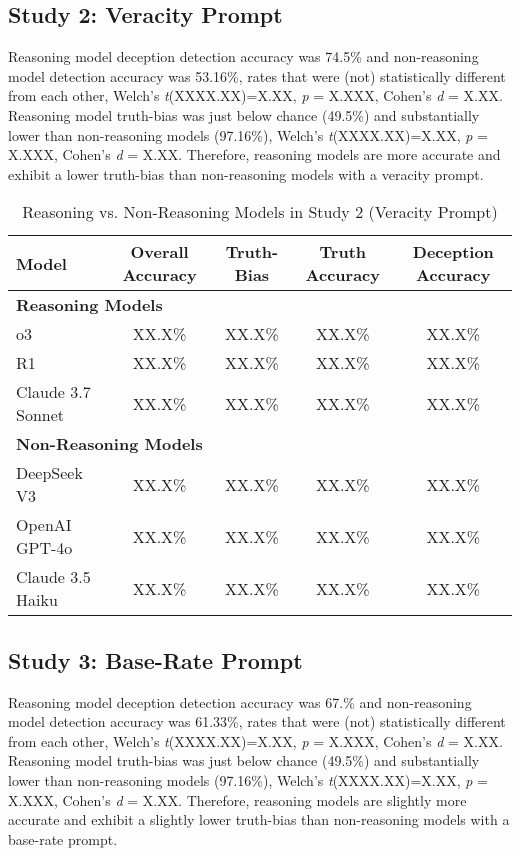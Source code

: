\documentclass{article}
\begin{document}
\subsection{Study 2: Veracity Prompt}

Reasoning model deception detection accuracy was 74.5\% and non-reasoning model detection accuracy was 53.16\%, rates that were (not) statistically different from each other, Welch's \textit{t}(XXXX.XX)=X.XX, \textit{p} = X.XXX, Cohen's \textit{d} = X.XX. Reasoning model truth-bias was just below chance (49.5\%) and substantially lower than non-reasoning models (97.16\%), Welch's \textit{t}(XXXX.XX)=X.XX, \textit{p} = X.XXX, Cohen's \textit{d} = X.XX. Therefore, reasoning models are more accurate and exhibit a lower truth-bias than non-reasoning models with a veracity prompt.

\begin{table}[ht]
\centering
\caption{Reasoning vs. Non-Reasoning Models in Study 2 (Veracity Prompt)}
\begin{tabular}{lcccc}
\toprule
\textbf{Model} & \textbf{Overall Accuracy} & \textbf{Truth-Bias} & \textbf{Truth Accuracy} & \textbf{Deception Accuracy} \\
\midrule
\multicolumn{5}{l}{\textbf{Reasoning Models}} \\
o3 & XX.X\% & XX.X\% & XX.X\% & XX.X\% \\
R1 & XX.X\% & XX.X\% & XX.X\% & XX.X\% \\
Claude 3.7 Sonnet & XX.X\% & XX.X\% & XX.X\% & XX.X\% \\
\midrule
\multicolumn{5}{l}{\textbf{Non-Reasoning Models}} \\
DeepSeek V3 & XX.X\% & XX.X\% & XX.X\% & XX.X\% \\
OpenAI GPT-4o & XX.X\% & XX.X\% & XX.X\% & XX.X\% \\
Claude 3.5 Haiku & XX.X\% & XX.X\% & XX.X\% & XX.X\% \\
\bottomrule
\end{tabular}
\label{tab:study1_model_comparison}
\end{table}

\subsection{Study 3: Base-Rate Prompt}

Reasoning model deception detection accuracy was 67.\% and non-reasoning model detection accuracy was 61.33\%, rates that were (not) statistically different from each other, Welch's \textit{t}(XXXX.XX)=X.XX, \textit{p} = X.XXX, Cohen's \textit{d} = X.XX. Reasoning model truth-bias was just below chance (49.5\%) and substantially lower than non-reasoning models (97.16\%), Welch's \textit{t}(XXXX.XX)=X.XX, \textit{p} = X.XXX, Cohen's \textit{d} = X.XX. Therefore, reasoning models are slightly more accurate and exhibit a slightly lower truth-bias than non-reasoning models with a base-rate prompt.
\end{document}
